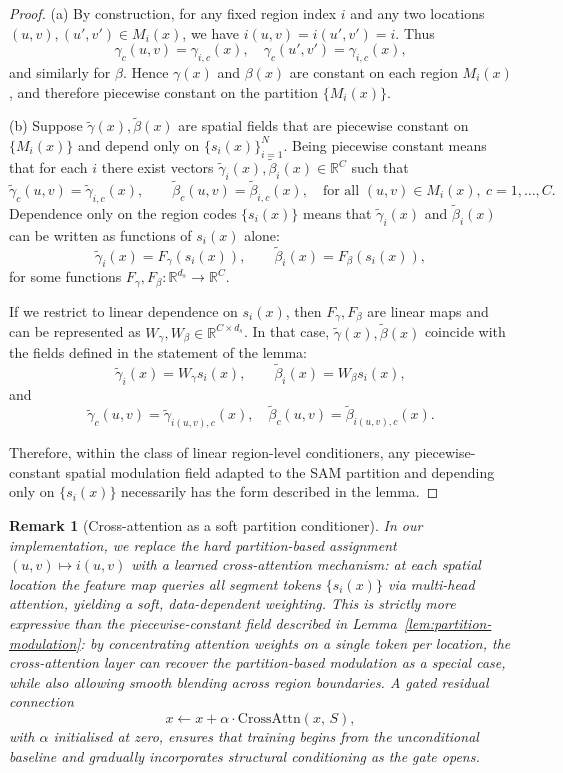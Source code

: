 \documentclass[12pt]{article}
\newtheorem{remark}{Remark}
\begin{document}
\begin{proof}
(a) By construction, for any fixed region index \(i\) and any two
locations \((u,v), (u',v') \in M_i(x)\), we have
\(i(u,v) = i(u',v') = i\).
Thus
\[
\gamma_c(u,v) = \gamma_{i,c}(x), \quad
\gamma_c(u',v') = \gamma_{i,c}(x),
\]
and similarly for \(\beta\).
Hence \(\gamma(x)\) and \(\beta(x)\) are constant on each region
\(M_i(x)\), and therefore piecewise constant on the partition
\(\{M_i(x)\}\).

(b) Suppose \(\tilde{\gamma}(x),\tilde{\beta}(x)\) are spatial fields that
are piecewise constant on \(\{M_i(x)\}\) and depend only on
\(\{s_i(x)\}_{i=1}^N\).
Being piecewise constant means that for each \(i\) there exist vectors
\(\tilde{\gamma}_i(x), \tilde{\beta}_i(x) \in \mathbb{R}^C\) such that
\[
\tilde{\gamma}_c(u,v) = \tilde{\gamma}_{i,c}(x), \qquad
\tilde{\beta}_c(u,v) = \tilde{\beta}_{i,c}(x),
\quad \text{for all } (u,v) \in M_i(x), \ c=1,\dots,C.
\]
Dependence only on the region codes \(\{s_i(x)\}\) means that
\(\tilde{\gamma}_i(x)\) and \(\tilde{\beta}_i(x)\) can be written as
functions of \(s_i(x)\) alone:
\[
\tilde{\gamma}_i(x) = F_\gamma(s_i(x)), \qquad
\tilde{\beta}_i(x) = F_\beta(s_i(x)),
\]
for some functions \(F_\gamma, F_\beta : \mathbb{R}^{d_s} \to \mathbb{R}^C\).

If we restrict to linear dependence on \(s_i(x)\), then
\(F_\gamma, F_\beta\) are linear maps and can be represented as
\(W_\gamma, W_\beta \in \mathbb{R}^{C \times d_s}\).
In that case, \(\tilde{\gamma}(x),\tilde{\beta}(x)\) coincide with the
fields defined in the statement of the lemma:
\[
\tilde{\gamma}_i(x) = W_\gamma s_i(x), \qquad
\tilde{\beta}_i(x) = W_\beta s_i(x),
\]
and
\[
\tilde{\gamma}_c(u,v) = \tilde{\gamma}_{i(u,v),c}(x), \quad
\tilde{\beta}_c(u,v) = \tilde{\beta}_{i(u,v),c}(x).
\]

Therefore, within the class of linear region-level conditioners, any
piecewise-constant spatial modulation field adapted to the SAM partition
and depending only on \(\{s_i(x)\}\) necessarily has the form described
in the lemma.
\end{proof}

\begin{remark}[Cross-attention as a soft partition conditioner]
In our implementation, we replace the hard partition-based assignment
\((u,v) \mapsto i(u,v)\) with a learned cross-attention mechanism:
at each spatial location the feature map queries all segment tokens
\(\{s_i(x)\}\) via multi-head attention, yielding a soft, data-dependent
weighting.  This is strictly more expressive than the piecewise-constant
field described in Lemma~\ref{lem:partition-modulation}: by concentrating
attention weights on a single token per location, the cross-attention layer
can recover the partition-based modulation as a special case, while also
allowing smooth blending across region boundaries.
A gated residual connection
\[
x \leftarrow x + \alpha \cdot \mathrm{CrossAttn}(x,\, S),
\]
with \(\alpha\) initialised at zero, ensures that training begins from
the unconditional baseline and gradually incorporates structural
conditioning as the gate opens.
\end{remark}
\end{document}
